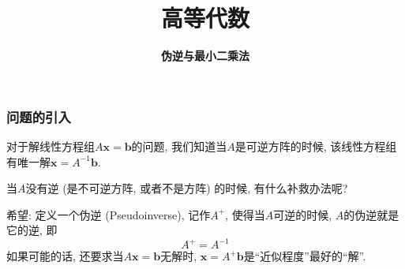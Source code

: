 



\title[高等代数]{\LARGE \bfseries 高等代数} %
\author[伪逆与最小二乘法] %
{\Large \bfseries 伪逆与最小二乘法}
\date{}






\begin{frame}

\titlepage %

\end{frame}


\begin{frame}
\frametitle{问题的引入}

对于解线性方程组$A\mathbf{x} = \mathbf{b}$的问题, 我们知道当$A$是可逆方阵的时候, 该线性方程组有唯一解$\mathbf{x} = A^{-1}\mathbf{b}$.

\vspace{1em}

当$A$没有逆 (是不可逆方阵, 或者不是方阵) 的时候, 有什么补救办法呢?

\pause
\vspace{1em}

希望: 定义一个伪逆 (Pseudoinverse), 记作$A^+$, 使得当$A$可逆的时候, $A$的伪逆就是它的逆, 即
\[A^+ = A^{-1}\]
如果可能的话, 还要求当$A\mathbf{x} = \mathbf{b}$无解时, $\mathbf{x} = A^+\mathbf{b}$是``近似程度''最好的``解''.

\end{frame}



